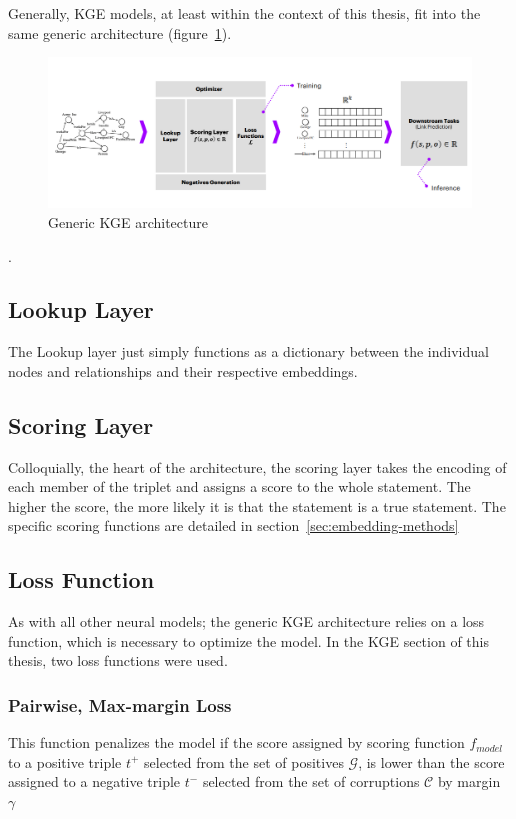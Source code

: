 Generally, KGE models, at least within the context of this thesis, fit into the same generic architecture (figure~\ref{fig:kge-architecture}).

\begin{figure}[h] %
    \centering %
    \includegraphics[width=1\linewidth]{figures/kge-architecture} %
    \caption{Generic KGE architecture~\cite{KGETutorial}} %
    \label{fig:kge-architecture} %
\end{figure}.

\subsection{Lookup Layer}
The Lookup layer just simply functions as a dictionary between the individual nodes and relationships and their respective embeddings.
\subsection{Scoring Layer}
Colloquially, the heart of the architecture, the scoring layer takes the encoding of each member of the triplet
and assigns a score to the whole statement.
The higher the score, the more likely it is that the statement is a true statement.
The specific scoring functions are detailed in section~\ref{sec:embedding-methods}

\subsection{Loss Function}
As with all other neural models; the generic KGE architecture relies on a loss function, which is necessary to optimize the model.
In the KGE section of this thesis, two loss functions were used.

\subsubsection{Pairwise, Max-margin Loss}
This function penalizes the model if the score assigned by scoring function $f_{model}$
to a positive triple $t^+$ selected from the set of positives $\mathcal{G}$, is lower than the score assigned to a
negative triple $t^-$ selected from the set of corruptions $\mathcal{C}$
by margin $\gamma$

